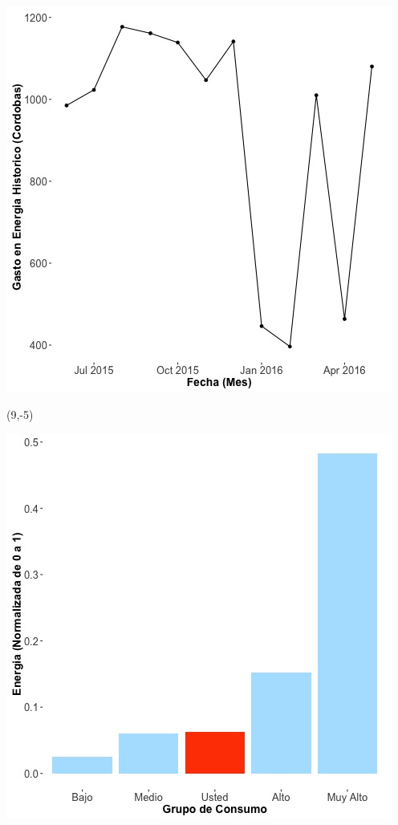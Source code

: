 \documentclass{article}\usepackage[]{graphicx}\usepackage[]{color}
\newenvironment{knitrout}{}{} %
\begin{document}
\begin{knitrout}
\color{fgcolor}
\includegraphics[scale=0.65]{figure/A20_historico_cordobas} 
\end{knitrout}

 \begin{textblock}{1}(9,-5)
\begin{minipage}{20em}
\begingroup

\endgroup
\end{minipage}
\end{textblock}


\begin{knitrout}
\color{fgcolor}
\includegraphics[scale=0.65]{figure/A20_neighbor_plot} 
\end{knitrout}
\end{document}
